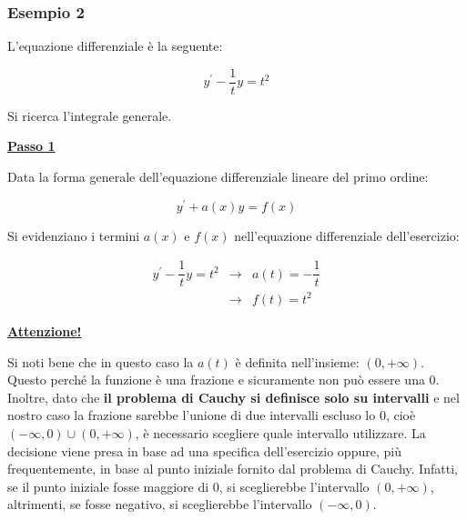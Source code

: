 \documentclass[a4paper]{article}
\begin{document}
	\subsubsection[Esempio 2]{\textcolor{Green4}{\textbf{Esempio 2}}}
	
	L'equazione differenziale è la seguente:
	
	\begin{equation*}
		y^{'} - \dfrac{1}{t} y = t^{2}
	\end{equation*}

	\noindent
	Si ricerca l'integrale generale.\newline
	
	\noindent
	\textcolor{Red3}{\textbf{\underline{Passo 1}}}\newline
	
	\noindent
	Data la forma generale dell'equazione differenziale lineare del primo ordine:
	
	\begin{equation*}
		y^{'} + a\left(x\right) y = f\left(x\right)
	\end{equation*}
	
	\noindent
	Si evidenziano i termini $a\left(x\right)$ e $f\left(x\right)$ nell'equazione differenziale dell'esercizio:
	
	\begin{equation*}
		\begin{array}{lll}
			y^{'} - \dfrac{1}{t} y = t^{2}	& \longrightarrow & a\left(t\right) = - \dfrac{1}{t} \\
											& \longrightarrow & f\left(t\right) = t^{2}
		\end{array}
	\end{equation*}

	\begin{center}
		\noindent
		\textcolor{Blue3}{\textbf{\underline{Attenzione!}}}
	\end{center}
	Si noti bene che in questo caso la $a\left(t\right)$ è definita nell'insieme: $\left(0, +\infty\right)$. Questo perché la funzione è una frazione e sicuramente non può essere una $0$. Inoltre, dato che \textbf{il problema di Cauchy si definisce solo su intervalli} e nel nostro caso la frazione sarebbe l'unione di due intervalli escluso lo $0$, cioè $\left(-\infty, 0\right) \cup \left(0, +\infty\right)$, è necessario scegliere quale intervallo utilizzare. La decisione viene presa in base ad una specifica dell'esercizio oppure, più frequentemente, in base al punto iniziale fornito dal problema di Cauchy. Infatti, se il punto iniziale fosse maggiore di $0$, si sceglierebbe l'intervallo $\left(0, +\infty\right)$, altrimenti, se fosse negativo, si sceglierebbe l'intervallo $\left(-\infty, 0\right)$.\newline
	
\end{document}
